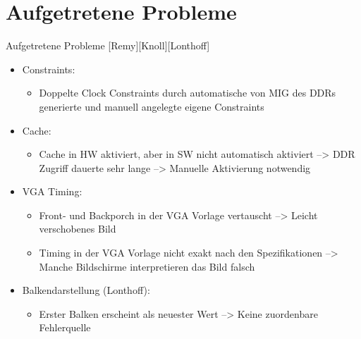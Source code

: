 \section*{Aufgetretene Probleme}
\begin{frame}{Aufgetretene Probleme [Remy][Knoll][Lonthoff]}
    \begin{itemize}
        \item Constraints:
        \begin{itemize}
            \item Doppelte Clock Constraints durch automatische von MIG des DDRs generierte und manuell angelegte eigene Constraints
        \end{itemize}
        \item Cache:
        \begin{itemize}
            \item Cache in HW aktiviert, aber in SW nicht automatisch aktiviert
            \newline
            --> DDR Zugriff dauerte sehr lange
            \newline
            --> Manuelle Aktivierung notwendig
        \end{itemize}
        \item VGA Timing:
        \begin{itemize}
            \item Front- und Backporch in der VGA Vorlage vertauscht
            \newline
            --> Leicht verschobenes Bild
            \item Timing in der VGA Vorlage nicht exakt nach den Spezifikationen
            \newline
            --> Manche Bildschirme interpretieren das Bild falsch
        \end{itemize}
        \item Balkendarstellung (Lonthoff):
        \begin{itemize}
            \item Erster Balken erscheint als neuester Wert
            \newline
            --> Keine zuordenbare Fehlerquelle
        \end{itemize}
    \end{itemize}
\end{frame}